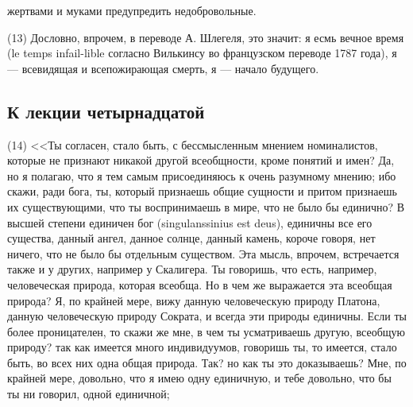 \documentclass[12pt]{article}
\begin{document}
жертвами и муками предупредить недобровольные. 

(13) Дословно, впрочем, в переводе А. Шлегеля, это значит: я есмь вечное время (le temps infail-lible согласно Вилькинсу во французском переводе 1787 года), я --- всевидящая и всепожирающая смерть, я --- начало будущего. 

\subsection*{К лекции четырнадцатой}

(14) <<Ты согласен, стало быть, с бессмысленным мнением номиналистов, которые не признают никакой другой всеобщности, кроме понятий и имен? Да, но я полагаю, что я тем самым присоединяюсь к очень разумному мнению; ибо скажи, ради бога, ты, который признаешь общие сущности и притом признаешь их существующими, что ты воспринимаешь в мире, что не было бы единично? В высшей степени единичен бог (singulanssinius est deus), единичны все его существа, данный ангел, данное солнце, данный камень, короче говоря, нет ничего, что не было бы отдельным существом. Эта мысль, впрочем, встречается также и у других, например у Скалигера. Ты говоришь, что есть, например, человеческая природа, которая всеобща. Но в чем же выражается эта всеобщая природа? Я, по крайней мере, вижу данную человеческую природу Платона, данную человеческую природу Сократа, и всегда эти природы единичны. Если ты более проницателен, то скажи же мне, в чем ты усматриваешь другую, всеобщую природу? так как имеется много индивидуумов, говоришь ты, то имеется, стало быть, во всех них одна общая природа. Так? но как ты это доказываешь? Мне, по крайней мере, довольно, что я имею одну единичную, и тебе довольно, что бы ты ни говорил, одной единичной; 
\end{document}
